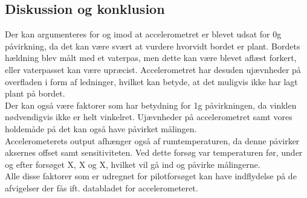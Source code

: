 \subsection{Diskussion og konklusion}
Der kan argumenteres for og imod at accelerometret er blevet udsat for 0g påvirkning, da det kan være svært at vurdere hvorvidt bordet er plant. Bordets hældning blev målt med et vaterpas, men dette kan være blevet aflæst forkert, eller vaterpasset kan være upræcist. Accelerometret har desuden ujævnheder på overfladen i form af ledninger, hvilket kan betyde, at det muligvis ikke har lagt plant på bordet. \\
Der kan også være faktorer som har betydning for 1g påvirkningen, da vinklen nødvendigvis ikke er helt vinkelret. Ujævnheder på accelerometret samt vores holdemåde på det kan også have påvirket målingen. \\
Accelerometerets output afhænger også af rumtemperaturen, da denne påvirker aksernes offset samt sensitiviteten. Ved dette forsøg var temperaturen før, under og efter forsøget X, X og X, hvilket vil gå ind og påvirke målingerne. \\
Alle disse faktorer som er udregnet for pilotforsøget kan have indflydelse på de afvigelser der fås ift. databladet for accelerometeret.